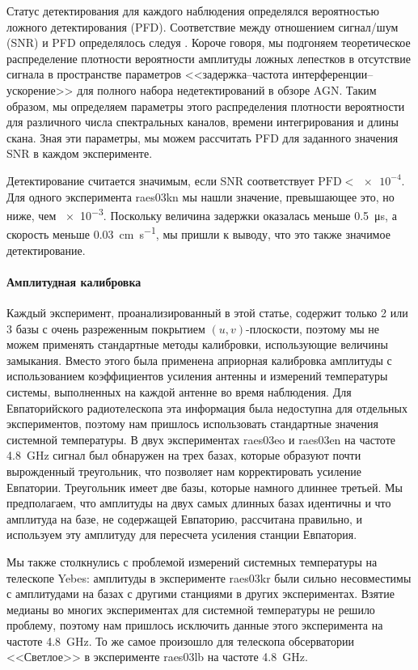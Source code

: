 Статус детектирования для каждого наблюдения определялся вероятностью ложного детектирования (PFD).
Соответствие между отношением сигнал/шум (SNR) и PFD определялось следуя \cite{Petrov_2011}. Короче
говоря, мы подгоняем теоретическое распределение плотности вероятности амплитуды ложных лепестков в
отсутствие сигнала в пространстве параметров <<задержка--частота интерференции--ускорение>> для
полного набора недетектирований в обзоре AGN. Таким образом, мы определяем параметры этого
распределения плотности вероятности для различного числа спектральных каналов, времени
интегрирования и длины скана. Зная эти параметры, мы можем рассчитать PFD для заданного значения SNR
в каждом эксперименте.

Детектирование считается значимым, если SNR соответствует $\text{PFD}<\num{e-4}$. Для одного
эксперимента raes03kn мы нашли значение, превышающее это, но ниже, чем \num{e-3}. Поскольку величина
задержки оказалась меньше \SI{0.5}{\us}, а скорость меньше \SI{0.03}{\cm\per\second}, мы пришли к
выводу, что это также значимое детектирование.

\paragraph{Амплитудная калибровка}

Каждый эксперимент, проанализированный в этой статье, содержит только 2 или 3 базы с очень
разреженным покрытием $(u, v)$-плоскости, поэтому мы не можем применять стандартные методы
калибровки, использующие величины замыкания. Вместо этого была применена априорная калибровка
амплитуды с использованием коэффициентов усиления антенны и измерений температуры системы,
выполненных на каждой антенне во время наблюдения. Для Евпаторийского радиотелескопа эта информация
была недоступна для отдельных экспериментов, поэтому нам пришлось использовать стандартные значения
системной температуры. В двух экспериментах raes03eo и raes03en на частоте \SI{4.8}{\GHz} сигнал
был обнаружен на трех базах, которые образуют почти вырожденный треугольник, что позволяет
нам корректировать усиление Евпатории. Треугольник имеет две базы, которые намного длиннее
третьей. Мы предполагаем, что амплитуды на двух самых длинных базах идентичны и что
амплитуда на базе, не содержащей Евпаторию, рассчитана правильно, и используем эту
амплитуду для пересчета усиления станции Евпатория.

Мы также столкнулись с проблемой измерений системных температуры на телескопе Yebes: амплитуды в
эксперименте raes03kr были сильно несовместимы с амплитудами на базах с другими станциями в
других экспериментах. Взятие медианы во многих экспериментах для системной температуры не
решило проблему, поэтому нам пришлось исключить данные этого эксперимента на частоте \SI{4.8}{\GHz}.
То же самое произошло для телескопа обсерватории <<Светлое>> в эксперименте raes03lb на частоте
\SI{4.8}{\GHz}.

